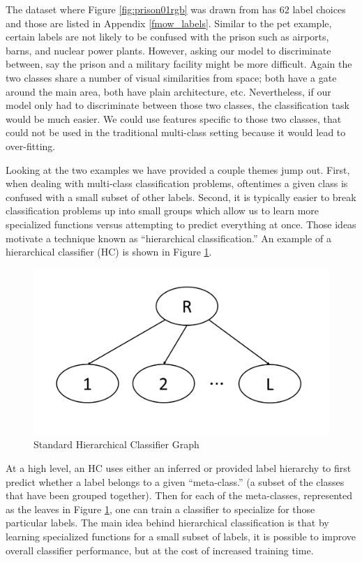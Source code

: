\documentclass[draft, ../thesis.tex]{subfiles}
\begin{document}
    The dataset where Figure \ref{fig:prison01rgb} was drawn from has $62$ label
    choices and those are listed in Appendix \ref{fmow_labels}. Similar to the
    pet example, certain labels are not likely to be confused with the prison
    such as airports, barns, and nuclear power plants. However, asking our model
    to discriminate between, say the prison and a military facility might be
    more difficult. Again the two classes share a number of visual similarities
    from space; both have a gate around the main area, both have plain
    architecture, etc. Nevertheless, if our model only had to discriminate
    between those two classes, the classification task would be much easier. We
    could use features specific to those two classes, that could not be used in
    the traditional multi-class setting because it would lead to over-fitting.

    Looking at the two examples we have provided a couple themes jump out.
    First, when dealing with multi-class classification problems, oftentimes a
    given class is confused with a small subset of other labels. Second, it is
    typically easier to break classification problems up into small groups which
    allow us to learn more specialized functions versus attempting to predict
    everything at once. Those ideas motivate a technique known as ``hierarchical
    classification.'' An example of a hierarchical classifier (HC) is shown in
    Figure \ref{fig:hierarchicalclassifier}.

    \begin{figure}
    	\centering
    	\includegraphics[width=0.7\linewidth]{images/hierarchical_classifier}
    	\caption{Standard Hierarchical Classifier Graph}
    	\label{fig:hierarchicalclassifier}
    \end{figure}

    At a high level, an HC uses either an inferred or provided label hierarchy
    to first predict whether a label belongs to a given ``meta-class.'' (a
    subset of the classes that have been grouped together). Then for each of the
    meta-classes, represented as the leaves in Figure
    \ref{fig:hierarchicalclassifier}, one can train a classifier to specialize
    for those particular labels. The main idea behind hierarchical
    classification is that by learning specialized functions for a small subset
    of labels, it is possible to improve overall classifier performance, but at
    the cost of increased training time.
\end{document}
